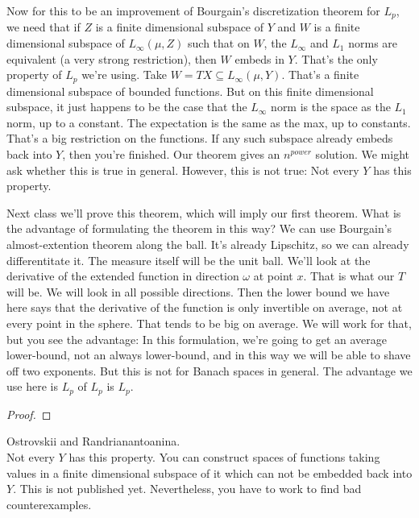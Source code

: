 \begin{thm}
Now for this to be an improvement of Bourgain's discretization theorem for $L_p$, we need that if $Z$ is a finite dimensional subspace of $Y$ and $W$ is a finite dimensional subspace of $L_{\infty}(\mu, Z)$ such that on $W$, the $L_{\infty}$ and $L_1$ norms are equivalent (a very strong restriction), then $W$ embeds in $Y$. 
That's the only property of $L_p$ we're using. Take $W = TX \subseteq L_{\infty}(\mu, Y)$. That's a finite dimensional subspace of bounded functions. But on this finite dimensional subspace, it just happens to be the case that the $L_{\infty}$ norm is the space as the $L_1$ norm, up to a constant. The expectation is the same as the max, up to constants. That's a big restriction on the functions. If any such subspace already embeds back into $Y$, then you're finished. Our theorem gives an $n^{power}$ solution. We might ask whether this is true in general. However, this is not true: Not every $Y$ has this property. 
\end{thm}
Next class we'll prove this theorem, which will imply our first theorem. What is the advantage of formulating the theorem in this way? We can use Bourgain's almost-extention theorem along the ball. It's already Lipschitz, so we can already differentitate it. The measure itself will be the unit ball. We'll look at the derivative of the extended function in direction $\omega$ at point $x$. That is what our $T$ will be. We will look in all possible directions. Then the lower bound we have here says that the derivative of the function is only invertible on average, not at every point in the sphere. That tends to be big on average. We will work for that, but you see the advantage: In this formulation, we're going to get an average lower-bound, not an always lower-bound, and in this way we will be able to shave off two exponents. But this is not for Banach spaces in general. The advantage we use here is $L_p$ of $L_p$ is $L_p$. 
\begin{proof}

\end{proof}

\begin{thm} Ostrovskii and Randrianantoanina. \\
Not every $Y$ has this property. You can construct spaces of functions taking values in a finite dimensional subspace of it which can not be embedded back into $Y$. 
This is not published yet. Nevertheless, you have to work to find bad counterexamples. 
\end{thm}

